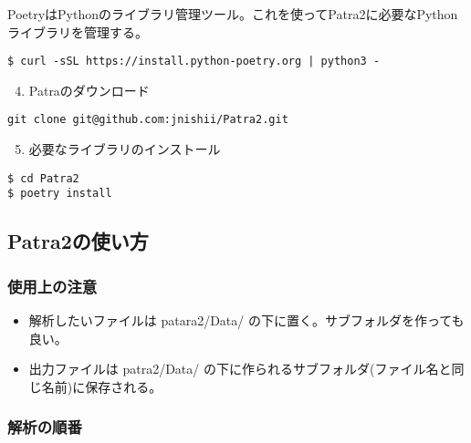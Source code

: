 \documentclass[]{jsarticle}
\providecommand{\tightlist}{%
   \setlength{\itemsep}{0pt}\setlength{\parskip}{0pt}}
\begin{document}
PoetryはPythonのライブラリ管理ツール。これを使ってPatra2に必要なPythonライブラリを管理する。

\begin{lstlisting}
$ curl -sSL https://install.python-poetry.org | python3 -
\end{lstlisting}

\begin{enumerate}
\setcounter{enumi}{3}
\tightlist
\item
  Patraのダウンロード
\end{enumerate}

\begin{lstlisting}
git clone git@github.com:jnishii/Patra2.git
\end{lstlisting}

\begin{enumerate}
\setcounter{enumi}{4}
\tightlist
\item
  必要なライブラリのインストール
\end{enumerate}

\begin{lstlisting}
$ cd Patra2
$ poetry install
\end{lstlisting}

\hypertarget{patra2ux306eux4f7fux3044ux65b9}{%
\subsection{Patra2の使い方}\label{patra2ux306eux4f7fux3044ux65b9}}

\hypertarget{ux4f7fux7528ux4e0aux306eux6ce8ux610f}{%
\subsubsection{使用上の注意}\label{ux4f7fux7528ux4e0aux306eux6ce8ux610f}}

\begin{itemize}
\tightlist
\item
  解析したいファイルは patara2/Data/
  の下に置く。サブフォルダを作っても良い。
\item
  出力ファイルは patra2/Data/
  の下に作られるサブフォルダ(ファイル名と同じ名前)に保存される。
\end{itemize}

\hypertarget{ux89e3ux6790ux306eux9806ux756a}{%
\subsubsection{解析の順番}\label{ux89e3ux6790ux306eux9806ux756a}}
\end{document}
